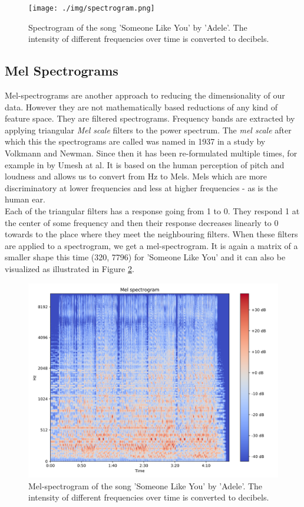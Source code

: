 \begin{figure}[h!]
    \centering
	\texttt{[image: ./img/spectrogram.png]}
	\caption{Spectrogram of the song 'Someone Like You' by 'Adele'. The intensity of different frequencies over time is converted to decibels.}
	\label{fig:ilustrative_specrogram}
\end{figure}


\subsection{Mel Spectrograms}\label{ssec:mel_spectrograms_intro}
Mel-spectrograms are another approach to reducing the dimensionality of our data. However they are not mathematically based reductions of any kind of feature space. They are filtered spectrograms. Frequency bands are extracted by applying triangular \textit{Mel scale} filters to the power spectrum. The \textit{mel scale} after which this the spectrograms are called was named in 1937 in a study \cite{1937ASAJ....8..185S} by Volkmann and Newman. Since then it has been re-formulated multiple times, for example in \cite{mel_scale_fit} by Umesh at al. It is based on the human perception of pitch and loudness and allows us to convert from Hz to Mels. Mels which are more discriminatory at lower frequencies and less at higher frequencies - as is the human ear. \\
Each of the triangular filters has a response going from 1 to 0. They respond 1 at the center of some frequency and then their response decreases linearly to 0 towards to the place where they meet the neighbouring filters. When these filters are applied to a spectrogram, we get a mel-spectrogram. It is again a matrix of a smaller shape this time (320, 7796) for 'Someone Like You' and it can also be visualized as illustrated in Figure \ref{fig:ilustrative_melspecrogram}.

\begin{figure}[h!]
    \centering
	\includegraphics[width=140mm]{./img/melspectrogram.png}
	\caption{Mel-spectrogram of the song 'Someone Like You' by 'Adele'. The intensity of different frequencies over time is converted to decibels.}
	\label{fig:ilustrative_melspecrogram}
\end{figure}

